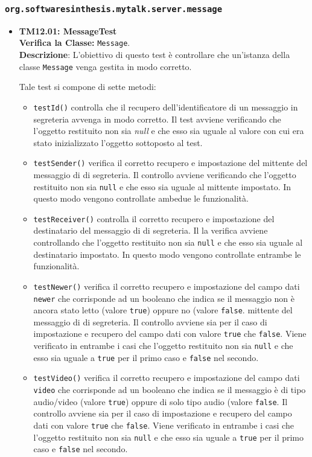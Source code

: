 \subsubsection{\texttt{org.softwaresinthesis.mytalk.server.message}}
\begin{itemize}

\item \textbf{TM12.01: MessageTest}\\
\textbf{Verifica la Classe:} \texttt{Message}.\\
\textbf{Descrizione}: L'obiettivo di questo test è controllare che un'istanza della classe \texttt{Message} venga gestita in modo corretto.

Tale test si compone di sette metodi:
\begin{itemize}
\item \texttt{testId()} controlla che il recupero dell'identificatore di un messaggio in segreteria avvenga in modo corretto. 
Il test avviene verificando che l'oggetto restituito non sia \textit{null} e che esso sia uguale al valore con cui era stato inizializzato l'oggetto sottoposto al test.
\item \texttt{testSender()} verifica il corretto recupero e impostazione del mittente del messaggio di di segreteria.
Il controllo avviene verificando che l'oggetto restituito non sia \texttt{null} e che esso sia uguale al mittente impostato. In questo modo vengono controllate ambedue le funzionalità.
\item \texttt{testReceiver()} controlla il corretto recupero e impostazione del destinatario del messaggio di di segreteria.
Il la verifica avviene controllando che l'oggetto restituito non sia \texttt{null} e che esso sia uguale al destinatario impostato. In questo modo vengono controllate entrambe le funzionalità. 

\item \texttt{testNewer()} verifica il corretto recupero e impostazione del campo dati \texttt{newer} che corrisponde ad un booleano che indica se il messaggio non è ancora stato letto (valore \texttt{true}) oppure no (valore \texttt{false}.  mittente del messaggio di di segreteria.
Il controllo avviene sia per il caso di impostazione e recupero del campo dati con valore 	\texttt{true} che 	\texttt{false}. Viene verificato in entrambe i casi che l'oggetto restituito non sia \texttt{null} e che esso sia uguale a \texttt{true} per il primo caso e \texttt{false} nel secondo.

\item \texttt{testVideo()}  verifica il corretto recupero e impostazione del campo dati \texttt{video} che corrisponde ad un booleano che indica se il messaggio è di tipo audio/video (valore \texttt{true}) oppure di solo tipo audio (valore \texttt{false}.
Il controllo avviene sia per il caso di impostazione e recupero del campo dati con valore 	\texttt{true} che 	\texttt{false}. Viene verificato in entrambe i casi che l'oggetto restituito non sia \texttt{null} e che esso sia uguale a \texttt{true} per il primo caso e \texttt{false} nel secondo.


\end{itemize}
\end{itemize}
